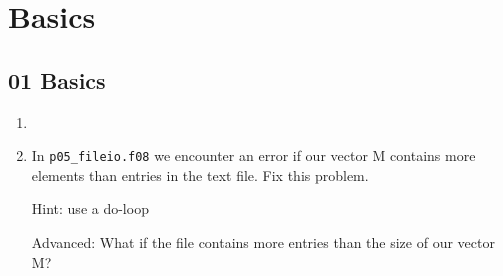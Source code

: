 
\section{Basics}

\subsection{01 Basics}
\begin{enumerate}
 \item 
 \item In \verb!p05_fileio.f08! we encounter an error if our vector M contains more elements than entries in the text file. Fix this problem.

Hint: use a do-loop

Advanced: What if the file contains more entries than the size of our vector M?
\end{enumerate}
